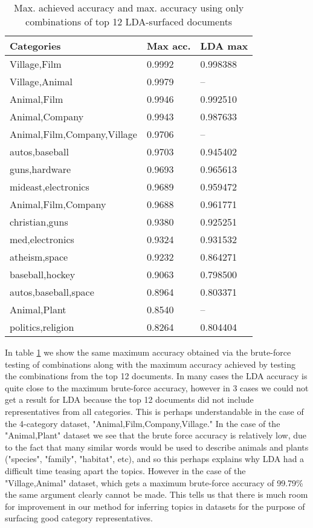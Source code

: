\begin{table}[]
\centering
\captionsetup{skip=0.5\baselineskip,size=footnotesize,position=bottom}
\footnotesize
\label{ldaacc}
\begin{tabular}{lll}
\toprule
Categories                  & Max acc. & LDA max \\
\midrule
Village,Film                & 0.9992       & 0.998388    \\
Village,Animal              & 0.9979       & --         \\
Animal,Film                 & 0.9946       & 0.992510    \\
Animal,Company              & 0.9943       & 0.987633    \\
Animal,Film,Company,Village & 0.9706       & --         \\
autos,baseball              & 0.9703       & 0.945402    \\
guns,hardware               & 0.9693       & 0.965613    \\
mideast,electronics         & 0.9689       & 0.959472    \\
Animal,Film,Company         & 0.9688       & 0.961771    \\
christian,guns              & 0.9380       & 0.925251    \\
med,electronics             & 0.9324       & 0.931532    \\
atheism,space               & 0.9232       & 0.864271    \\
baseball,hockey             & 0.9063       & 0.798500    \\
autos,baseball,space        & 0.8964       & 0.803371    \\
Animal,Plant                & 0.8540       & --         \\
politics,religion           & 0.8264       & 0.804404   \\
\bottomrule
\end{tabular}
\caption{Max. achieved accuracy and max. accuracy using only combinations of top 12 LDA-surfaced documents}
\end{table}

In table \ref{ldaacc} we show the same maximum accuracy obtained via the brute-force testing of combinations along with the maximum accuracy achieved by testing the combinations from the top 12 documents. In many cases the LDA accuracy is quite close to the maximum brute-force accuracy, however in 3 cases we could not get a result for LDA because the top 12 documents did not include representatives from all categories. This is perhaps understandable in the case of the 4-category dataset, "Animal,Film,Company,Village." In the case of the "Animal,Plant" dataset we see that the brute force accuracy is relatively low, due to the fact that many similar words would be used to describe animals and plants ("species", "family", "habitat", etc), and so this perhaps explains why LDA had a difficult time teasing apart the topics. However in the case of the "Village,Animal" dataset, which gets a maximum brute-force accuracy of 99.79\% the same argument clearly cannot be made. This tells us that there is much room for improvement in our method for inferring topics in datasets for the purpose of surfacing good category representatives.

